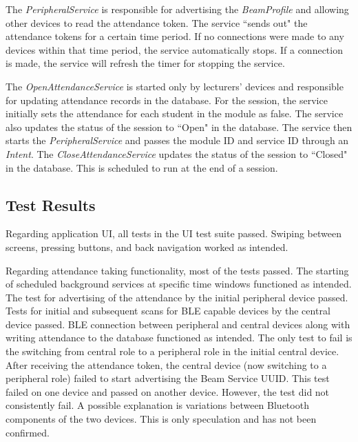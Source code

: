 \documentclass[../report.tex]{subfiles}
\begin{document}


The \textit{PeripheralService} is responsible for advertising the \textit{BeamProfile} and allowing other devices to read the attendance token. The service ``sends out" the attendance tokens for a certain time period. If no connections were made to any devices within that time period, the service automatically stops. If a connection is made, the service will refresh the timer for stopping the service.



The \textit{OpenAttendanceService} is started only by lecturers' devices and responsible for updating attendance records in the database. For the session, the service initially sets the attendance for each student in the module as false. The service also updates the status of the session to ``Open" in the database. The service then starts the \textit{PeripheralService} and passes the module ID and service ID through an \textit{Intent}. The \textit{CloseAttendanceService} updates the status of the session to ``Closed" in the database. This is scheduled to run at the end of a session.



\subsection{Test Results}
Regarding application UI, all tests in the UI test suite passed. Swiping between screens, pressing buttons, and back navigation worked as intended. 

Regarding attendance taking functionality, most of the tests passed. The starting of scheduled background services at specific time windows functioned as intended. The test for advertising of the attendance by the initial peripheral device passed. Tests for initial and subsequent scans for BLE capable devices by the central device passed. BLE connection between peripheral and central devices along with writing attendance to the database functioned as intended. The only test to fail is the switching from central role to a peripheral role in the initial central device. After receiving the attendance token, the central device (now switching to a peripheral role) failed to start advertising the Beam Service UUID. This test failed on one device and passed on another device. However, the test did not consistently fail. A possible explanation is variations between Bluetooth components of the two devices. This is only speculation and has not been confirmed. 
\end{document}
